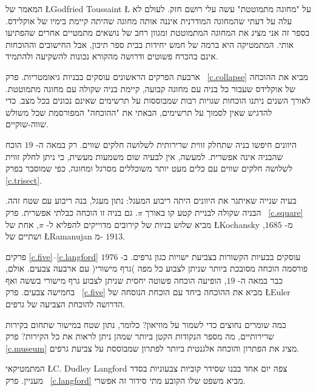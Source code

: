 \setcounter{page}{1}



המאמר של 
\L{Godfried Toussaint}
\L{\cite{toussaint}}
על "מחוגה מתמוטטת" עשה עלי רושם חזק. לעולם לא עלה על דעתי שהמחוגה המודרנית איננה אותה מחוגה שהיתה קיימת בימיו של אוקלידס. 
בספר זה אני מציג את המחוגה המתמוטטת ומגוון רחב של נושאים מתמטיים אחרים שהפתיעו אותי. המתמטיקה היא ברמה של חמש יחידות בבית ספר תיכון, אבל החישובים וההוכחות אינם בהכרח פשוטים ודרושה מהקורא נכונות להשקיעה ולהתמיד.


ארבעת הפרקים הראשונים עוסקים בבניות גיאומטריות. פרק~%
\ref{c.collapse}
מביא את ההוכחה של אוקלידס שעבור כל בניה עם מחוגה קבועה, קיימת בניה שקולה עם מחוגה מתמוטטת. לאורך השנים ניתנו הוכחות שגויות רבות  שמבוססות על תרשימים שאינם נכונים בכל מצב. כדי להדגיש שאין לסמוך על תרשימים, הבאתי את "ההוכחה" המפורסמת שכל משולש שווה-שוקיים.

היוונים חיפשו בניה שתחלק זווית שרירותית לשלושה חלקים שווים. רק במאה ה-%
$19$
הוכח שהבניה אינה אפשרית. למעשה, אין לבעיה שום משמעות מעשית, כי ניתן לחלק זווית לשלושה חלקים שווים עם כלים מעט יותר משוכללים מסרגל ומחוגה, כפי שמוסבר בפרק~%
\ref{c.trisect}.


בעיה שנייה שאיתגר את היוונים היתה ריבוע המעגל: נתון מעגל, בנה ריבוע עם שטח זהה. הבניה שקולה לבניית קטע קו באורך 
$\pi$.
גם בניה זו הוכחה כבלתי אפשרית. פרק~%
\ref{c.square}
מביא שלוש בניות של קירובים מדוייקים להפליא ל-%
$\pi$,
אחת של
\L{Kochansky}
מ-%
$1685$,
ושתיים של
\L{Ramanujan}
מ-%
$1913$.


פרקים
\ref{c.five}--\ref{c.langford}
עוסקים בבעיות הקשורות בצביעת ישויות כגון גרפים.
ב-%
$1976$
פורסמה הוכחה מסובכת ביותר שניתן לצבוע כל מפה )גרף מישורי( עם ארבעה צבעים. אולם, כבר במאה ה-%
$19$,
הופיעה הוכחה פשוטה יחסית שניתן לצבוע גרף מישורי בששה ואף בחמישה צבעים. פרק~%
\ref{c.five}
מביא את ההוכחה ביחד עם הוכחת הנוסחה של 
\L{Euler}
הדרושה להוכחת הצביעה של גרפים.


כמה שומרים נחוצים כדי לשמור על מוזיאון? כלומר, נתון שטח במישור שתחום בקירות שרירותיים, מה מספר הנקודות הקטן ביותר שמהן ניתן לראות את כל הקירות?
פרק~%
\ref{c.museum}
מציג את הפתרון והוכחה אלגנטית ביותר לפתרון שמבוססת על צביעת גרפים.


המתמטיקאי
\L{C. Dudley Langford}
צפה יום אחד בבנו שסידר קוביות צבעוניות בסדר מעניין. 
פרק~%
\ref{c.langford}
מביא משפט שלו הקובע מתי סידור זה אפשרי.


